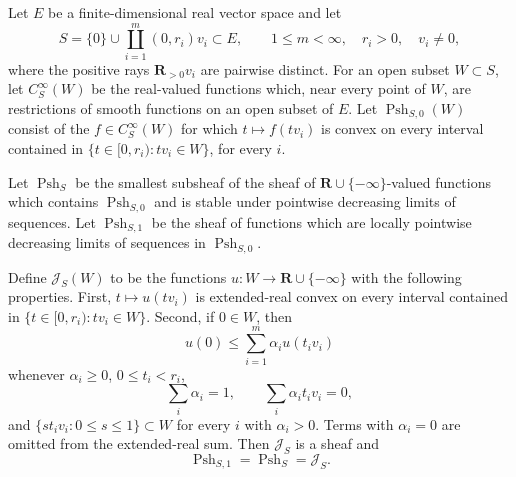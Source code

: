 
\begin{theorem}
\label{thm:ch16-collapse-finite-tropical-curves}
Let $E$ be a finite-dimensional real vector space and let
\begin{equation}
\label{eq:p071-local-finite-star}
 S=\{0\}\cup\coprod_{i=1}^{m}(0,r_i)v_i\subset E,
 \qquad 1\leq m<\infty,\quad r_i>0,\quad v_i\neq0,
\end{equation}
where the positive rays $\mathbf R_{>0}v_i$ are pairwise distinct.  For an
open subset $W\subset S$, let $C_S^\infty(W)$ be the real-valued functions
which, near every point of $W$, are restrictions of smooth functions on an
open subset of $E$.  Let $\operatorname{Psh}_{S,0}(W)$ consist of the
$f\in C_S^\infty(W)$ for which $t\mapsto f(tv_i)$ is convex on every
interval contained in
$\{t\in[0,r_i):tv_i\in W\}$, for every $i$.

Let $\operatorname{Psh}_S$ be the smallest subsheaf of the sheaf of
$\mathbf R\cup\{-\infty\}$-valued functions which contains
$\operatorname{Psh}_{S,0}$ and is stable under pointwise decreasing limits
of sequences.  Let $\operatorname{Psh}_{S,1}$ be the sheaf of functions
which are locally pointwise decreasing limits of sequences in
$\operatorname{Psh}_{S,0}$.

Define $\mathscr J_S(W)$ to be the functions
$u:W\to\mathbf R\cup\{-\infty\}$ with the following properties.  First,
$t\mapsto u(tv_i)$ is extended-real convex on every interval contained in
$\{t\in[0,r_i):tv_i\in W\}$.  Second, if $0\in W$, then
\begin{equation}
\label{eq:ch16-curve-junction-jensen}
 u(0)\leq\sum_{i=1}^{m}\alpha_i u(t_iv_i)
\end{equation}
whenever $\alpha_i\geq0$, $0\leq t_i<r_i$,
\begin{equation}
\label{eq:p071-junction-barycentre}
 \sum_i\alpha_i=1,
 \qquad
 \sum_i\alpha_i t_iv_i=0,
\end{equation}
and $\{st_iv_i:0\leq s\leq1\}\subset W$ for every $i$ with
$\alpha_i>0$.  Terms with $\alpha_i=0$ are omitted from the
extended-real sum.  Then $\mathscr J_S$ is a sheaf and
\begin{equation}
\label{eq:p071-model-star-characterization}
 \operatorname{Psh}_{S,1}=\operatorname{Psh}_S=\mathscr J_S.
\end{equation}


\end{theorem}
